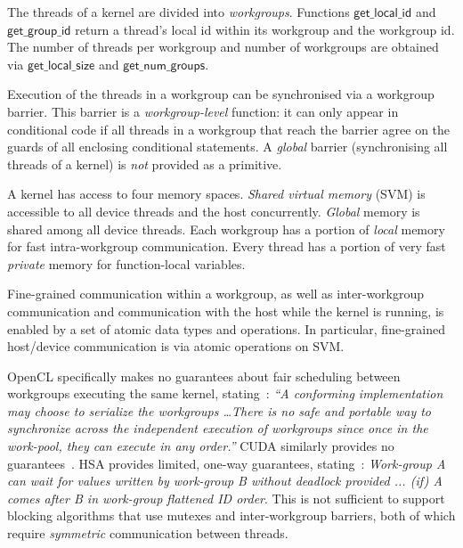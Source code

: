 \documentclass[sigconf]{acmart}
\newcommand{\getgroupid}{\mathsf{get\_group\_id}}
\newcommand{\getnumgroups}{\mathsf{get\_num\_groups}}
\newcommand{\getlocalid}{\mathsf{get\_local\_id}}
\newcommand{\getglobalid}{\mathsf{get\_global\_id}}
\newcommand{\getlocalsize}{\mathsf{get\_local\_size}}
\newcommand{\getglobalsize}{\mathsf{get\_global\_size}}
\begin{document}
The threads of a kernel are divided into \emph{workgroups}.
Functions
$\getlocalid$ and $\getgroupid$ return a thread's local id within
its workgroup and the workgroup id.
%
%
The number
of threads per workgroup and number of workgroups are obtained via
$\getlocalsize$ and $\getnumgroups$.

Execution of the threads in a workgroup can be synchronised via a
workgroup barrier. This barrier is a \emph{workgroup-level} function:
it can only appear in conditional code if all threads in a workgroup
that reach the barrier agree on the guards of all enclosing
conditional statements.  A \emph{global} barrier (synchronising all
threads of a kernel) is \emph{not} provided as a primitive.

 A kernel has access to
four memory spaces.  \emph{Shared virtual memory} (SVM) is accessible
to all device threads and the host concurrently.  \emph{Global} memory is
shared among all device threads.  Each workgroup has a
portion of \emph{local} memory for fast intra-workgroup communication.
Every thread has a portion of very fast \emph{private} memory for
function-local variables.

Fine-grained
communication within a workgroup, as well as inter-workgroup
communication and communication with the host while the kernel is
running, is enabled by a set of atomic data types and operations.  In
particular, fine-grained host/device communication is via atomic
operations on SVM.

OpenCL specifically makes no guarantees about fair scheduling between
workgroups executing the same kernel, stating~\cite[p.\ 31]{opencl2Spec}: \emph{``A
  conforming implementation may choose to serialize the workgroups
\dots There is no safe and portable way to synchronize across
  the independent execution of workgroups since once in the work-pool,
  they can execute in any order.''}  CUDA similarly provides no guarantees~\cite{cuda-75}.
%
HSA provides limited, one-way guarantees,
stating~\cite[p. 46]{HSAprogramming11}: \emph{Work-group A can wait
  for values written by work-group B without deadlock provided ... (if) A
  comes after B in work-group flattened ID order}. This is not sufficient to support blocking algorithms that use
mutexes and inter-workgroup barriers, both of which require \emph{symmetric} communication between
threads.
\end{document}
